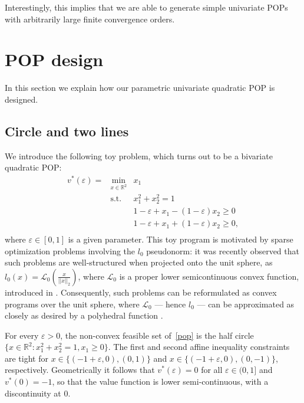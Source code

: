 \documentclass[a4paper,12pt]{article}
\newcommand{\R}{\mathbb{R}} %
\newcommand{\adrien}[1]{{\color{magenta} #1}}
\begin{document}
Interestingly, this implies that we are able to generate simple univariate POPs with arbitrarily large {finite} convergence orders.

\section{POP design}
\label{sec:popdesign}
In this section we explain how our parametric univariate quadratic POP is designed.

\subsection{Circle and two lines}


We {introduce} the following toy problem, which turns out to be a bivariate quadratic POP:
\begin{equation}\label{pop}
\begin{array}{rrl}
v^*(\varepsilon) = & \min_{x \in \R^2} & x_1 \\
& \mathrm{s.t.} & x^2_1 + x^2_2 = 1 \\
& & 1-\varepsilon + x_1 - (1-\varepsilon) x_2 \geq 0 \\
& & 1-\varepsilon + x_1 + (1-\varepsilon) x_2 \geq 0, \\
\end{array}
\end{equation}
where $\varepsilon \in [0,1]$ is a given parameter. 
This toy program is motivated by sparse optimization
problems involving the $l_0$ pseudonorm: it was recently observed that
such problems are well-structured when projected onto the unit sphere, as 
$l_0(x) = \mathcal{L}_0(\frac{x}{||x||_2})$, where 
$\mathcal{L}_0$ is a proper lower semicontinuous convex function,
introduced in \cite{chancelier2021hidden}.
Consequently, such problems can be reformulated as convex programs
over the unit sphere, where $\mathcal{L}_0$ --- hence $l_0$ --- can be approximated
as closely as desired by a polyhedral function \cite{le2022}. 

{For every $\varepsilon > 0$,} the non-convex feasible set of~\eqref{pop} is the half circle $\{x \in \R^2 : x^2_1+x^2_2 = 1, x_1 \geq 0\}$. 
{The first and second affine inequality constraints are tight for $x \in \{(-1+\varepsilon,0), (0,1)\}$ and $x \in \{(-1+\varepsilon,0), (0,-1)\}$, respectively.}
Geometrically it follows that $v^*(\varepsilon) = 0$ for all $\varepsilon \in (0,1]$ and $v^*(0)=-1$, so that the value function is lower semi-continuous, with a discontinuity at $0$. 
\end{document}
